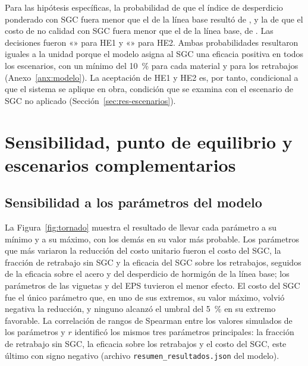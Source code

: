 Para las hipótesis específicas, la probabilidad de que el índice de desperdicio ponderado con SGC fuera menor que el de la línea base resultó de \PHEuno{}, y la de que el costo de no calidad con SGC fuera menor que el de la línea base, de \PHEdos{}. Las decisiones fueron «\DecHEuno» para HE1 y «\DecHEdos» para HE2. Ambas probabilidades resultaron iguales a la unidad porque el modelo asigna al SGC una eficacia positiva en todos los escenarios, con un mínimo del 10~\% para cada material y para los retrabajos (Anexo~\ref{anx:modelo}). La aceptación de HE1 y HE2 es, por tanto, condicional a que el sistema se aplique en obra, condición que se examina con el escenario de SGC no aplicado (Sección~\ref{sec:res-escenarios}).

\begin{table}[H]
\caption{Contraste de las hipótesis con las reglas de decisión probabilísticas}
\label{tab:contraste-resultados}
\end{table}

\section{Sensibilidad, punto de equilibrio y escenarios complementarios}
\label{sec:res-sensibilidad}

\subsection{Sensibilidad a los parámetros del modelo}
\label{sec:res-tornado}

La Figura~\ref{fig:tornado} muestra el resultado de llevar cada parámetro a su mínimo y a su máximo, con los demás en su valor más probable. Los parámetros que más variaron la reducción del costo unitario fueron el costo del SGC, la fracción de retrabajo sin SGC y la eficacia del SGC sobre los retrabajos, seguidos de la eficacia sobre el acero y del desperdicio de hormigón de la línea base; los parámetros de las viguetas y del EPS tuvieron el menor efecto. El costo del SGC fue el único parámetro que, en uno de sus extremos, su valor máximo, volvió negativa la reducción, y ninguno alcanzó el umbral del 5~\% en su extremo favorable. La correlación de rangos de Spearman entre los valores simulados de los parámetros y $r$ identificó los mismos tres parámetros principales: la fracción de retrabajo sin SGC, la eficacia sobre los retrabajos y el costo del SGC, este último con signo negativo (archivo \texttt{resumen\_resultados.json} del modelo).

